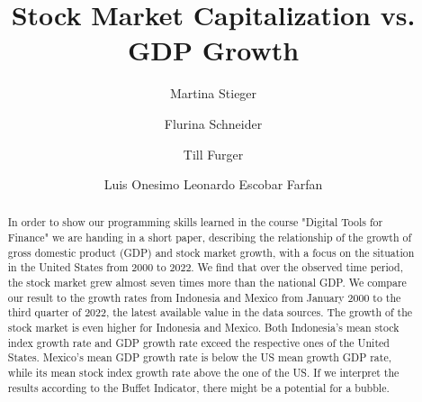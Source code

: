 \documentclass[12pt,a4paper,english]{article}
\title{Stock Market Capitalization vs. GDP Growth}
\author[1]{Martina Stieger}
\author[1]{Flurina Schneider}
\author[1]{Till Furger}
\author[1]{Luis Onesimo Leonardo Escobar Farfan}
\affil[1]{University of Zurich, Plattenstrasse 14, 8032 Zurich, Switzerland}
\begin{document}

\maketitle

\begin{abstract} 
\noindent In order to show our programming skills learned in the course "Digital Tools for Finance" we are
	handing in a short paper, describing the relationship of the growth of gross domestic product (GDP) and stock
	market growth, with a focus on the situation in the United States from 2000 to 2022. We find that over the observed time period, the stock market grew almost seven times more than the national GDP. We compare our result to the growth rates from Indonesia and Mexico from January 2000 to the third quarter of 2022, the latest available value in the data sources. The growth of the stock market is even higher for Indonesia and Mexico. Both Indonesia's mean stock index growth rate and GDP growth rate exceed the respective ones of the United States. Mexico's mean GDP growth rate is below the US mean growth GDP rate, while its mean stock index growth rate above the one of the US. If we interpret the results according to the Buffet Indicator, there might be a potential for a bubble. 
\end{abstract}

\hfill

\noindent{}\\
\noindent{}\\

\newpage


\tableofcontents
\listoffigures
\listoftables
\newpage
\end{document}
